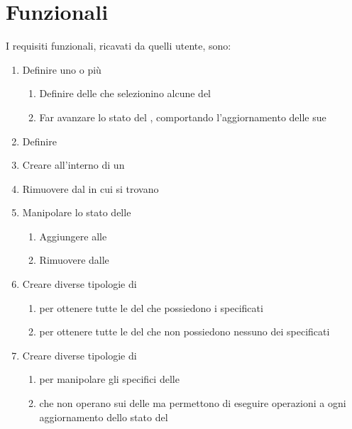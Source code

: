 \section{Funzionali}\label{sec:funzionali}
I requisiti funzionali, ricavati da quelli utente, sono:
\begin{enumerate}[label=\textbf{\ref{sec:funzionali}.\arabic*}]
    \item \label{itm:f1} Definire uno o più \World
    \begin{enumerate}[label=\textbf{\ref{itm:f1}.\arabic*}]
        \item \label{itm:ff1} Definire delle \View che selezionino alcune \Entity del \World
        \item \label{itm:ff2} Far avanzare lo stato del \World, comportando l'aggiornamento delle sue \Entity
    \end{enumerate}
    \item \label{itm:f2} Definire \Component
    \item \label{itm:f3} Creare \Entity all'interno di un \World
    \item \label{itm:f4} Rimuovere \Entity dal \World in cui si trovano
    \item \label{itm:f5} Manipolare lo stato delle \Entity
    \begin{enumerate}[label=\textbf{\ref{itm:f5}.\arabic*}]
        \item \label{itm:ff3} Aggiungere \Component alle \Entity
        \item \label{itm:ff4} Rimuovere \Component dalle \Entity
    \end{enumerate}
    \item \label{itm:f6} Creare diverse tipologie di \View
    \begin{enumerate}[label=\textbf{\ref{itm:f6}.\arabic*}]
        \item \label{itm:ff5} \View per ottenere tutte le \Entity del \World che possiedono i \Component specificati
        \item \label{itm:ff6} \View per ottenere tutte le \Entity del \World che non possiedono nessuno dei \Component specificati
    \end{enumerate}
    \item \label{itm:f7} Creare diverse tipologie di \System
    \begin{enumerate}[label=\textbf{\ref{itm:f7}.\arabic*}]
        \item \label{itm:ff7} \System per manipolare gli specifici \Component delle \Entity
        \item \label{itm:ff10} \System che non operano sui \Component delle \Entity ma permettono di eseguire operazioni a ogni aggiornamento dello stato del \World

\end{enumerate}
\end{enumerate}
